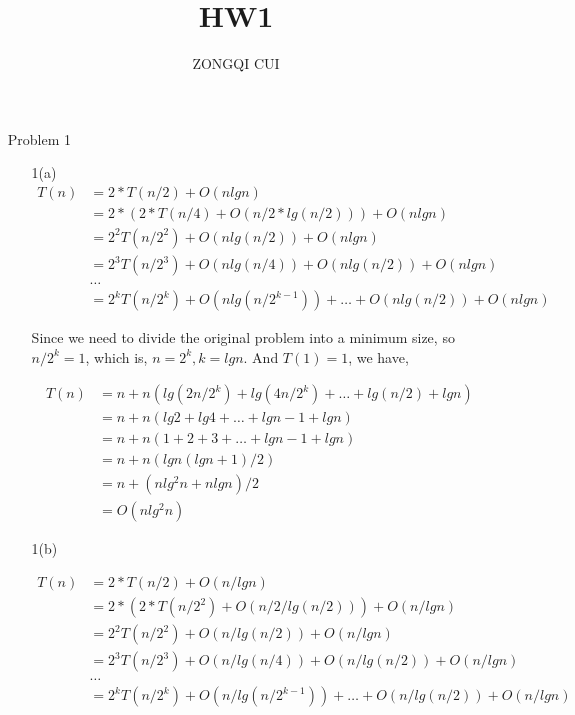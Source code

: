 \documentclass[12pt,letterpaper]{article}
\title{HW1}
\author{ZONGQI CUI}
\begin{document}
\section{}
    \begin{itemize}
    
        \item[Problem 1]\par
        \begin{itemize}
            
            \item[1(a)] $$\begin{aligned}
                T(n)&=2*T(n/2)+O(nlgn)\\
                &=2*(2*T(n/4)+O(n/2*lg(n/2)))+O(nlgn)\\
                &=2^2T(n/2^2)+O(nlg(n/2))+O(nlgn)\\
                &=2^3T(n/2^3)+O(nlg(n/4))+O(nlg(n/2))+O(nlgn)\\
                &\dots\\
                &=2^kT(n/2^k)+O(nlg(n/2^{k-1}))+\dots+O(nlg(n/2))+O(nlgn)
                \end{aligned}$$
                
                Since we need to divide the original problem into a minimum size, so $n/2^k =1$, which is, $n=2^k, k=lgn$.  And $T(1)=1$, we have,
                
                $$\begin{aligned}
                T(n) &= n+n(lg(2n/2^k)+lg(4n/2^k)+\dots+lg(n/2)+lgn)\\
                &= n+n(lg2+lg4+\dots+lgn-1+lgn)\\
                &=n+n(1+2+3+\dots+lgn-1+lgn)\\
                &=n+n(lgn(lgn+1)/2)\\
                &=n+(nlg^2n+nlgn)/2\\
                &=O(nlg^2n)
                \end{aligned}$$
    
            \item[1(b)] 

            
            $$\begin{aligned}
                T(n)&=2*T(n/2)+O(n/lgn)\\
                &=2*(2*T(n/2^2)+O(n/2/lg(n/2)))+O(n/lgn)\\
                &=2^2T(n/2^2)+O(n/lg(n/2))+O(n/lgn)\\
                &=2^3T(n/2^3)+O(n/lg(n/4))+O(n/lg(n/2))+O(n/lgn)\\
                &\dots\\
                &=2^kT(n/2^k)+O(n/lg(n/2^{k-1}))+\dots+O(n/lg(n/2))+O(n/lgn)
                \end{aligned}$$
                

\end{itemize}
\end{itemize}
\end{document}
